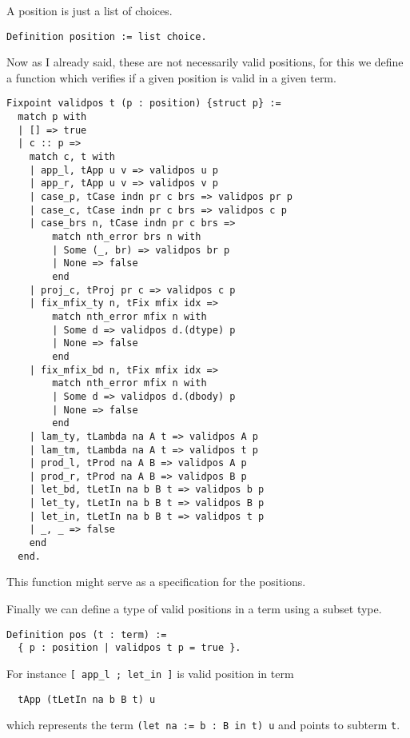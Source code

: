 A position is just a list of choices.
\begin{verbatim}
Definition position := list choice.
\end{verbatim}

Now as I already said, these are not necessarily valid positions, for this
we define a function which verifies if a given position is valid in a given
term.
\begin{verbatim}
Fixpoint validpos t (p : position) {struct p} :=
  match p with
  | [] => true
  | c :: p =>
    match c, t with
    | app_l, tApp u v => validpos u p
    | app_r, tApp u v => validpos v p
    | case_p, tCase indn pr c brs => validpos pr p
    | case_c, tCase indn pr c brs => validpos c p
    | case_brs n, tCase indn pr c brs =>
        match nth_error brs n with
        | Some (_, br) => validpos br p
        | None => false
        end
    | proj_c, tProj pr c => validpos c p
    | fix_mfix_ty n, tFix mfix idx =>
        match nth_error mfix n with
        | Some d => validpos d.(dtype) p
        | None => false
        end
    | fix_mfix_bd n, tFix mfix idx =>
        match nth_error mfix n with
        | Some d => validpos d.(dbody) p
        | None => false
        end
    | lam_ty, tLambda na A t => validpos A p
    | lam_tm, tLambda na A t => validpos t p
    | prod_l, tProd na A B => validpos A p
    | prod_r, tProd na A B => validpos B p
    | let_bd, tLetIn na b B t => validpos b p
    | let_ty, tLetIn na b B t => validpos B p
    | let_in, tLetIn na b B t => validpos t p
    | _, _ => false
    end
  end.
\end{verbatim}
This function might serve as a specification for the positions.

Finally we can define a type of valid positions in a term using a subset type.
\begin{verbatim}
Definition pos (t : term) :=
  { p : position | validpos t p = true }.
\end{verbatim}

For instance \texttt{[ app_l ; let_in ]} is valid position in term
\begin{verbatim}
  tApp (tLetIn na b B t) u
\end{verbatim}
which represents the term \texttt{(let na := b : B in t) u}
and points to subterm \texttt{t}.

